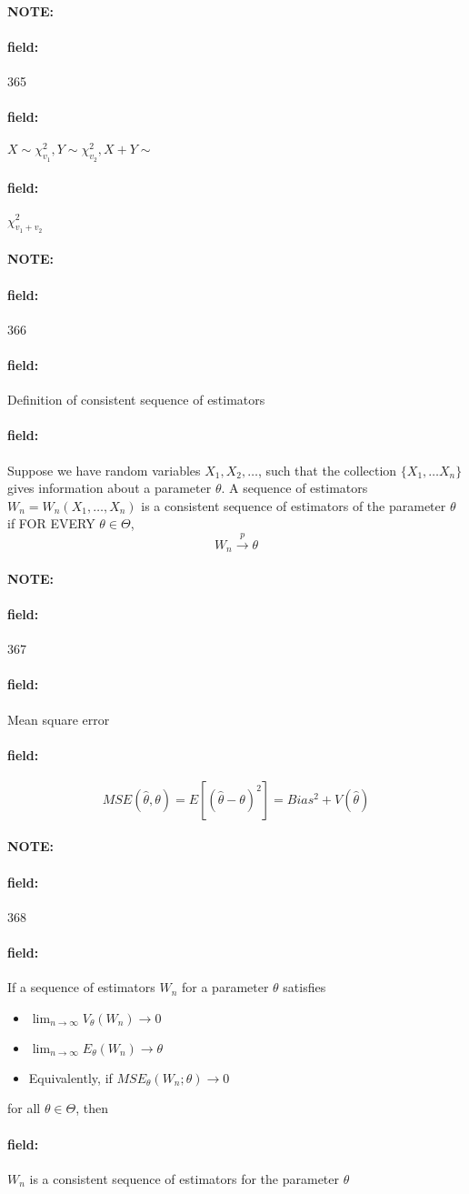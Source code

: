 \documentclass[12pt]{article}
\newenvironment{note}{\paragraph{NOTE:}}{}
\newenvironment{field}{\paragraph{field:}}{}
\begin{document}
\begin{note}
    \begin{field}
        \tiny 365
    \end{field}
    \begin{field}
        $X \sim \chi^2_{v_1}, Y \sim \chi^2_{v_2}, X + Y \sim $
    \end{field}
    \begin{field}
        $\chi^2_{v_1 + v_2}$
    \end{field}
\end{note}


\begin{note}
    \begin{field}
        \tiny 366
    \end{field}
    \begin{field}
        Definition of consistent sequence of estimators
    \end{field}
    \begin{field}
        Suppose we have random variables $X_1, X_2, \ldots$, such that the collection $\{X_1, \ldots X_n\}$ gives information about a parameter $\theta$. A sequence of estimators $W_n = W_n(X_1, \ldots, X_n)$ is a consistent sequence of estimators of the parameter $\theta$ if FOR EVERY $\theta \in \Theta$,
        $$W_n \overset{p}{\to} \theta $$
    \end{field}
\end{note}

\begin{note}
    \begin{field}
        \tiny 367
    \end{field}
    \begin{field}
        Mean square error
    \end{field}
    \begin{field}
        $$MSE(\hat{\theta},\theta) = E[(\hat{\theta} - \theta)^2] = Bias^2 + V(\hat{\theta})$$
    \end{field}
\end{note}

\begin{note}
    \begin{field}
        \tiny 368
    \end{field}
    \begin{field}
        If a sequence of estimators $W_n$ for a parameter $\theta$ satisfies
        \begin{itemize}
          \item $\lim_{n\to\infty} V_\theta(W_n) \to 0$
          \item $\lim_{n\to\infty} E_{\theta}(W_n) \to \theta$
          \item Equivalently, if $MSE_\theta(W_n;\theta) \to 0$
        \end{itemize}
        for all $\theta \in \Theta$, then
    \end{field}
    \begin{field}
        $W_n$ is a consistent sequence of estimators for the parameter $\theta$
    \end{field}
\end{note}
\end{document}
